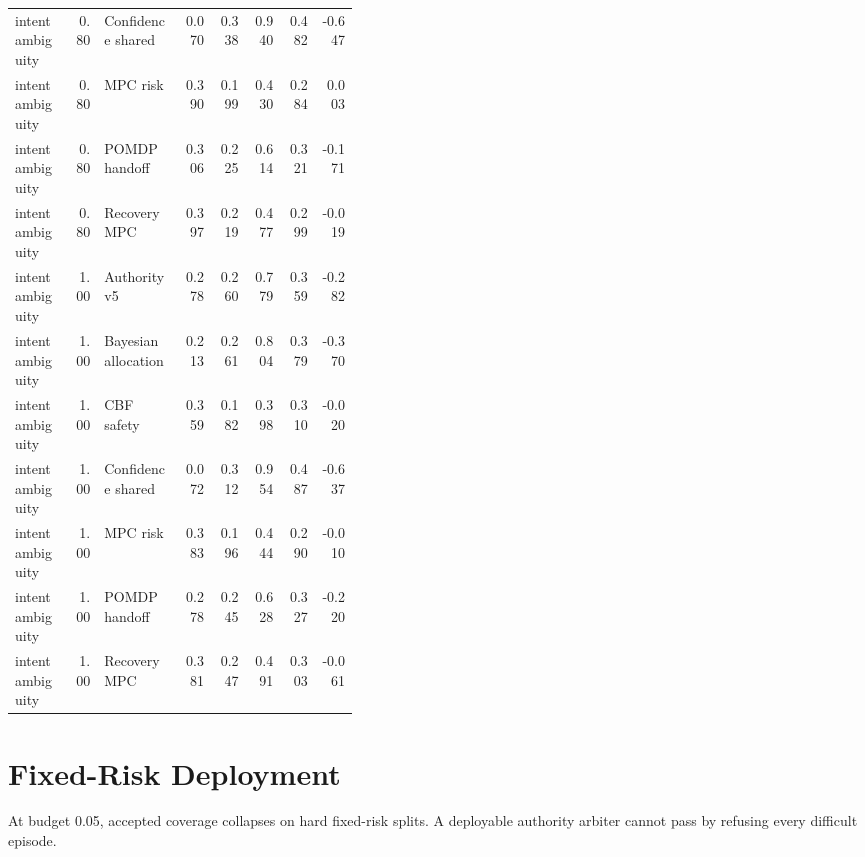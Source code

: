 \documentclass{article}
\begin{document}
\begin{center}
\begin{longtable}{p{0.17\linewidth}rp{0.23\linewidth}rrrrr}
intent ambiguity & 0.80 & Confidence shared & 0.070 & 0.338 & 0.940 & 0.482 & -0.647\\
intent ambiguity & 0.80 & MPC risk & 0.390 & 0.199 & 0.430 & 0.284 & 0.003\\
intent ambiguity & 0.80 & POMDP handoff & 0.306 & 0.225 & 0.614 & 0.321 & -0.171\\
intent ambiguity & 0.80 & Recovery MPC & 0.397 & 0.219 & 0.477 & 0.299 & -0.019\\
intent ambiguity & 1.00 & Authority v5 & 0.278 & 0.260 & 0.779 & 0.359 & -0.282\\
intent ambiguity & 1.00 & Bayesian allocation & 0.213 & 0.261 & 0.804 & 0.379 & -0.370\\
intent ambiguity & 1.00 & CBF safety & 0.359 & 0.182 & 0.398 & 0.310 & -0.020\\
intent ambiguity & 1.00 & Confidence shared & 0.072 & 0.312 & 0.954 & 0.487 & -0.637\\
intent ambiguity & 1.00 & MPC risk & 0.383 & 0.196 & 0.444 & 0.290 & -0.010\\
intent ambiguity & 1.00 & POMDP handoff & 0.278 & 0.245 & 0.628 & 0.327 & -0.220\\
intent ambiguity & 1.00 & Recovery MPC & 0.381 & 0.247 & 0.491 & 0.303 & -0.061\\
\bottomrule
\end{longtable}
\normalsize
\end{center}

\section{Fixed-Risk Deployment}

At budget 0.05, accepted coverage collapses on hard fixed-risk splits. A deployable authority arbiter cannot pass by refusing every difficult episode.
\end{document}

